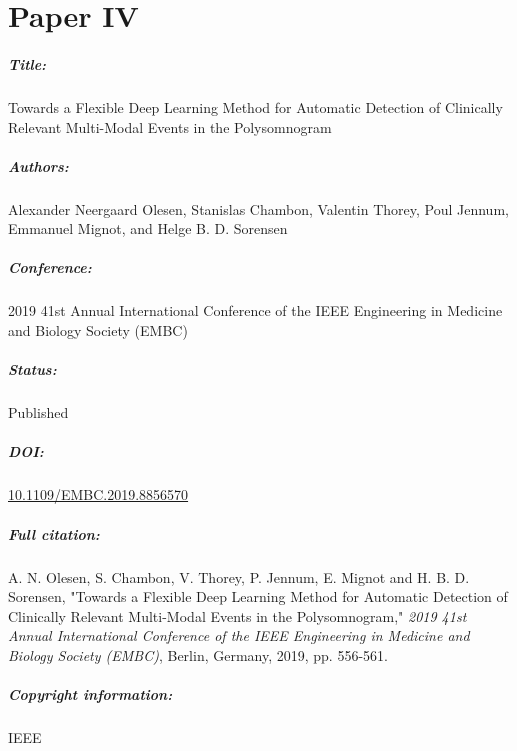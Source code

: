 \chapter{Paper IV}

\paragraph{Title:}
Towards a Flexible Deep Learning Method for Automatic Detection of Clinically Relevant Multi-Modal Events in the Polysomnogram

\paragraph{Authors:}
Alexander Neergaard Olesen, Stanislas Chambon, Valentin Thorey, Poul Jennum, Emmanuel Mignot, and Helge B. D. Sorensen

\paragraph{Conference:}
2019 41st Annual International Conference of the IEEE Engineering in Medicine and Biology Society (EMBC)

\paragraph{Status:}
Published

\paragraph{DOI:}
\href{https://doi.org/10.1109/EMBC.2019.8856570}{10.1109/EMBC.2019.8856570}

\paragraph{Full citation:}
A. N. Olesen, S. Chambon, V. Thorey, P. Jennum, E. Mignot and H. B. D. Sorensen, "Towards a Flexible Deep Learning Method for Automatic Detection of Clinically Relevant Multi-Modal Events in the Polysomnogram," \textit{2019 41st Annual International Conference of the IEEE Engineering in Medicine and Biology Society (EMBC)}, Berlin, Germany, 2019, pp. 556-561.

\paragraph{Copyright information:}
 IEEE


